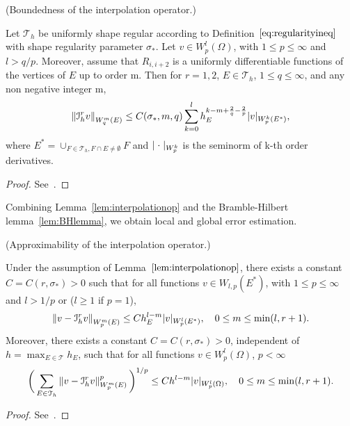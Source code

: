 \begin{lem}\label{lem:interpolationop}
		  (Boundedness of the interpolation operator.)

		  Let $\mathcal{T}_h$ be uniformly shape regular according to Definition~$\ref{eq:regularityineq}$
		  with shape regularity parameter $\sigma_*$.
		  Let $v \in W^l_p(\Omega)$, with $1\leq p \leq \infty$ and $l >q/p$. %
		  Moreover, assume that $R_{i,i+2}$ is a uniformly differentiable functions of the vertices of $E$ up to order m.
		  Then for $r= 1,2$, $E \in \mathcal{T}_h$, 
		  $1\leq q \leq \infty$, and any non negative integer m,
		  \begin{equation}\label{eq:interpolationopbound}
		 \left\lVert\mathcal{I}_h^r v\right\rVert_{W_q^m(E)} \leq C(\sigma_*, m, q) \sum_{k=0}^l
					 h_E^{k-m+\frac{2}{q}-\frac{2}{p}} \lvert v\rvert_{W^k_p(E^*)},
		  \end{equation}
		  where $E^* = \cup_{F \in \mathcal{T}_h, F \cap E \neq \emptyset} F$ and
		  $\lvert\hspace{0.1cm} \cdot\hspace{0.1cm} \rvert_{W_p^k}$ is the seminorm of k-th order derivatives.
\end{lem}
\begin{proof}
		  See~\cite{directSerendipity}.
\end{proof}

Combining Lemma~\ref{lem:interpolationop} and the Bramble-Hilbert lemma~\ref{lem:BHlemma}, we 
obtain local and global error estimation.
\begin{lem}\label{lem:approximation}
		  (Approximability of the interpolation operator.)

		  Under the assumption of Lemma~$\ref{lem:interpolationop}$, there exists a 
		  constant $C = C(r, \sigma_*) > 0$ such that for all functions 
		  $v \in W_{l,p}(E^*)$, with $1\leq p \leq \infty$ and $l>1/p$ or 
		  ($l\geq 1$ if $p=1$),
		  \begin{equation}\label{eq:brambleHilbertDS}
					 \left\lVert v-\mathcal{I}_h^r v\right\rVert_{W^m_p(E)} \leq C h_E^{l-m}
					 \lvert v \rvert_{W^l_p(E^*)}, \quad 0 \leq m \leq \min(l,r+1).
		  \end{equation}
		  Moreover, there exists a constant $C = C(r,\sigma_*) > 0$, independent
		  of $h = \max_{E \in \mathcal{T}} h_E$, such that for all functions 
		  $v \in W_p^l(\Omega)$, $p<\infty$
		  \begin{equation}
					 \bigg(\sum_{E\in\mathcal{T}_h} \left\lVert v - \mathcal{I}_h^r v\right\rVert^p_{W_p^m(E)}\bigg)^{1/p} \leq C h^{l-m} \lvert v \rvert_{W_p^l(\Omega)}, \quad 0 \leq m \leq \min(l, r+1).
		  \end{equation}
\end{lem}
\begin{proof}
		  See~\cite{directSerendipity}.
\end{proof}

